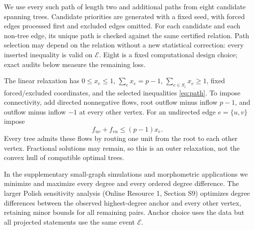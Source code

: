 \documentclass[11pt]{article}
\theoremstyle{plain}
\theoremstyle{definition}\newtheorem{remark}{Remark}\newtheorem{example}{Example}
\begin{document}
We use every such path of length two and additional paths from eight candidate spanning trees. Candidate priorities are generated with a fixed seed, with forced edges processed first and excluded edges omitted. For each candidate and each non-tree edge, its unique path is checked against the same certified relation. Path selection may depend on the relation without a new statistical correction: every inserted inequality is valid on $\mathcal E$. Eight is a fixed computational design choice; exact audits below measure the remaining loss.

The linear relaxation has $0\le x_e\le1$, $\sum_e x_e=p-1$, $\sum_{e\in S_i}x_e\ge1$, fixed forced/excluded coordinates, and the selected inequalities \eqref{eq:path}. To impose connectivity, add directed nonnegative flows, root outflow minus inflow $p-1$, and outflow minus inflow $-1$ at every other vertex. For an undirected edge $e=\{u,v\}$ impose
\[
 f_{uv}+f_{vu}\le(p-1)x_e.
\]
Every tree admits these flows by routing one unit from the root to each other vertex. Fractional solutions may remain, so this is an outer relaxation, not the convex hull of compatible optimal trees.

In the supplementary small-graph simulations and morphometric applications we minimize and maximize every degree and every ordered degree difference. The larger Polish sensitivity analysis (Online Resource 1, Section S9) optimizes degree differences between the observed highest-degree anchor and every other vertex, retaining minor bounds for all remaining pairs. Anchor choice uses the data but all projected statements use the same event $\mathcal E$.
\end{document}
